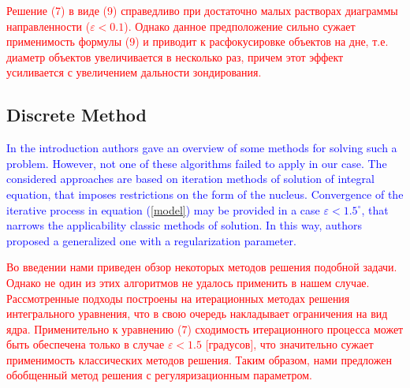 \documentclass{procDDs}
\begin{document}
\textcolor{red}{Решение (7) в виде (9) справедливо при достаточно малых растворах диаграммы направленности ($\varepsilon<0.1$). Однако данное предположение сильно сужает применимость формулы (9) и приводит к расфокусировке объектов на дне, т.е. диаметр объектов увеличивается в несколько раз, причем этот эффект усиливается с увеличением дальности зондирования.}

\subsection{Discrete Method}
\textcolor{blue}{In the introduction authors gave an overview of some methods for solving such a problem. However, not one of these algorithms failed to apply in our case. The considered approaches are based on iteration methods of solution of integral equation, that imposes restrictions on the form of the nucleus. Convergence of the iterative process in equation (\ref{model}) may be provided in a case $\varepsilon < 1.5^\circ$, that narrows the applicability classic methods of solution. In this way, authors proposed a generalized one with a regularization parameter.}

\textcolor{red}{ Во введении нами приведен обзор некоторых методов решения подобной задачи. Однако не один из этих алгоритмов не удалось применить в нашем случае. Рассмотренные подходы построены на итерационных методах решения интегрального уравнения, что в свою очередь накладывает ограничения на вид ядра. Применительно к уравнению (7) сходимость итерационного процесса  может быть обеспечена только в случае $\varepsilon < 1.5$ [градусов], что значительно сужает применимость классических методов решения. Таким образом, нами предложен обобщенный метод решения с регуляризационным параметром.}
\end{document}
